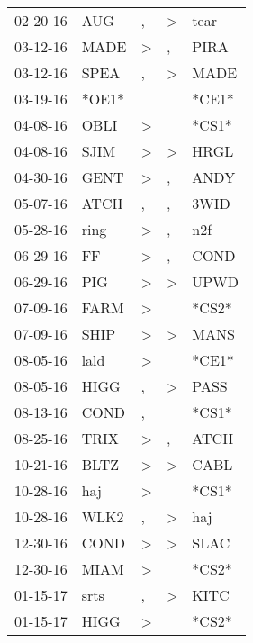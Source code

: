 \begin{supertabular}{lllll}
 02-20-16 &    AUG &                , &     \textgreater &   tear \\
 03-12-16 &   MADE &     \textgreater &                , &   PIRA \\
 03-12-16 &   SPEA &                , &     \textgreater &   MADE \\
 03-19-16 &  *OE1* &                  &                  &  *CE1* \\
 04-08-16 &   OBLI &     \textgreater &                  &  *CS1* \\
 04-08-16 &   SJIM &     \textgreater &     \textgreater &   HRGL \\
 04-30-16 &   GENT &     \textgreater &                , &   ANDY \\
 05-07-16 &   ATCH &                , &                , &   3WID \\
 05-28-16 &   ring &     \textgreater &                , &    n2f \\
 06-29-16 &     FF &     \textgreater &                , &   COND \\
 06-29-16 &    PIG &     \textgreater &     \textgreater &   UPWD \\
 07-09-16 &   FARM &     \textgreater &                  &  *CS2* \\
 07-09-16 &   SHIP &     \textgreater &     \textgreater &   MANS \\
 08-05-16 &   lald &     \textgreater &                  &  *CE1* \\
 08-05-16 &   HIGG &                , &     \textgreater &   PASS \\
 08-13-16 &   COND &                , &                  &  *CS1* \\
 08-25-16 &   TRIX &     \textgreater &                , &   ATCH \\
 10-21-16 &   BLTZ &     \textgreater &     \textgreater &   CABL \\
 10-28-16 &    haj &     \textgreater &                  &  *CS1* \\
 10-28-16 &   WLK2 &                , &     \textgreater &    haj \\
 12-30-16 &   COND &     \textgreater &     \textgreater &   SLAC \\
 12-30-16 &   MIAM &     \textgreater &                  &  *CS2* \\
 01-15-17 &   srts &                , &     \textgreater &   KITC \\
 01-15-17 &   HIGG &     \textgreater &                  &  *CS2* \\

\end{supertabular}
